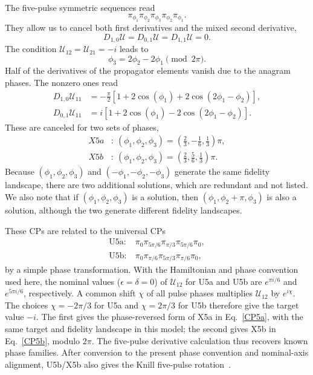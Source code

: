 \documentclass[10pt,aps,twocolumn,pra,floatfix,superscriptaddress]{revtex4-2}
\def\be{ \begin{equation} }
\def\ee{ \end{equation} }
\begin{document}
The five-pulse symmetric sequences read
\be\label{X5sym}
\pi_{\phi_1} \pi_{\phi_2} \pi_{\phi_3} \pi_{\phi_2} \pi_{\phi_1} .
\ee
They allow us to cancel both first derivatives and the mixed second derivative,
\be
D_{1,0} \mathcal{U} = D_{0,1} \mathcal{U} = D_{1,1} \mathcal{U} = 0.
\ee
The condition $\mathcal{U}_{12} = \mathcal{U}_{21} = -i$ leads to
\be
\phi_3 = 2\phi_2 - 2\phi_1 \pmod{2\pi}.
\ee
Half of the derivatives of the propagator elements vanish due to the anagram phases.
The nonzero ones read
\begin{subequations}
\begin{align}
D_{1,0} \mathcal{U}_{11} &= -\frac{\pi}{2} \left[ 1+2\cos(\phi_1)+2\cos(2\phi_1-\phi_2) \right]  ,\\
D_{0,1} \mathcal{U}_{11} &= i \left[ 1+2\cos(\phi_1)-2\cos(2\phi_1-\phi_2) \right]  .
\end{align}
\end{subequations}
These are canceled for two sets of phases,
\begin{subequations}\label{CP5}
\begin{align}
X5a &:\ (\phi_1,\phi_2,\phi_3) = (\tfrac23,-\tfrac16,\tfrac13)\pi, \label{CP5a} \\
X5b &:\ (\phi_1,\phi_2,\phi_3) = (\tfrac23,\tfrac56,\tfrac13)\pi. \label{CP5b} 
\end{align}
\end{subequations}
Because $(\phi_1,\phi_2,\phi_3)$ and $(-\phi_1,-\phi_2,-\phi_3)$ generate the same fidelity landscape, there are two additional solutions, which are redundant and not listed. 
We also note that if $(\phi_1,\phi_2,\phi_3)$ is a solution, then $(\phi_1,\phi_2+\pi,\phi_3)$ is also a solution, although the two generate different fidelity landscapes.

These CPs are related to the universal CPs \cite{PhysRevLett.113.043001}
\begin{subequations} \label{CP5universal}
\begin{align}
\text{U5a:}&\ \pi_{0} \pi_{5\pi/6} \pi_{\pi/3} \pi_{5\pi/6} \pi_{0} , \\
\text{U5b:}&\ \pi_{0} \pi_{\pi/6} \pi_{5\pi/3} \pi_{\pi/6} \pi_{0} , 
\end{align}
\end{subequations}
by a simple phase transformation.
With the Hamiltonian and phase convention used here, the nominal values ($\epsilon=\delta=0$) of $\mathcal{U}_{12}$ for U5a and U5b are $e^{\pi i/6}$ and $e^{5\pi i/6}$, respectively. A common shift $\chi$ of all pulse phases multiplies $\mathcal{U}_{12}$ by $e^{i\chi}$. The choices $\chi=-2\pi/3$ for U5a and $\chi=2\pi/3$ for U5b therefore give the target value $-i$. The first gives the phase-reversed form of X5a in Eq.~\eqref{CP5a}, with the same target and fidelity landscape in this model; the second gives X5b in Eq.~\eqref{CP5b}, modulo $2\pi$.
The five-pulse derivative calculation thus recovers known phase families. After conversion to the present phase convention and nominal-axis alignment, U5b/X5b also gives the Knill five-pulse rotation~\cite{Ryan_2010,qile}.
\end{document}
